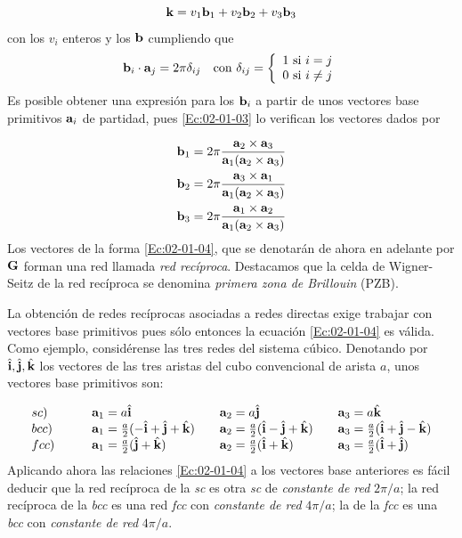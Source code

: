\begin{equation}
    \mathbf{k} = v_1 \mathbf{b}_1 + v_2 \mathbf{b}_2 + v_3 \mathbf{b}_3 \label{Ec:02-01-02}
\end{equation}
con los $v_i$ enteros y los $\mathbf{b}$ cumpliendo que
\begin{equation}
    \mathbf{b}_i \cdot \mathbf{a}_j = 2 \pi \delta_{ij}  \quad \text{con} \ \delta_{ij} = \left\lbrace \begin{array}{l}
        1 \ \text{si} \ i = j \\
        0 \ \text{si} \ i \neq j
    \end{array} \right. \label{Ec:02-01-03}
\end{equation}
Es posible obtener una expresión para los $\mathbf{b}_i$ a partir de unos vectores base primitivos $\mathbf{a}_i$ de partidad, pues \ref{Ec:02-01-03} lo verifican los vectores dados por

\begin{equation}
    \begin{split}    
    \mathbf{b}_1 & = 2 \pi \frac{\mathbf{a}_2 \times \mathbf{a}_3}{\mathbf{a}_1 (\mathbf{a}_2 \times \mathbf{a}_3)} \\
    \mathbf{b}_2 & = 2 \pi \frac{\mathbf{a}_3 \times \mathbf{a}_1}{\mathbf{a}_1 (\mathbf{a}_2 \times \mathbf{a}_3)}  \\
    \mathbf{b}_3 & = 2 \pi \frac{\mathbf{a}_1 \times \mathbf{a}_2}{\mathbf{a}_1 (\mathbf{a}_2 \times \mathbf{a}_3)}
    \end{split}\label{Ec:02-01-04}
\end{equation}
Los vectores de la forma \ref{Ec:02-01-04}, que se denotarán de ahora en adelante por $\mathbf{G}$ forman una red llamada \textit{red recíproca}. Destacamos que la celda de Wigner-Seitz de la red recíproca se denomina \textit{primera zona de Brillouin} (PZB). 

La obtención de redes recíprocas asociadas a redes directas exige trabajar con vectores base primitivos pues sólo entonces la ecuación \ref{Ec:02-01-04} es válida. Como ejemplo, considérense las tres redes del sistema cúbico. Denotando por $\hat{\mathbf{i}}, \hat{\mathbf{j}}, \hat{\mathbf{k}}$ los vectores de las tres aristas del cubo convencional de arista $a$, unos vectores base primitivos son:

\begin{equation*}
    \begin{array}{llll}
    sc) \quad &  \quad \mathbf{a}_1 = a \hat{\mathbf{i}} & \quad \mathbf{a}_2 = a \hat{\mathbf{j}} & \quad \mathbf{a}_3 = a \hat{\mathbf{k}} \\
    bcc)  \quad & \quad \mathbf{a}_1 = \frac{a}{2} (-\hat{\mathbf{i}}+\hat{\mathbf{j}}+\hat{\mathbf{k}}) & \quad \mathbf{a}_2 = \frac{a}{2} (\hat{\mathbf{i}}-\hat{\mathbf{j}}+\hat{\mathbf{k}})  & \quad \mathbf{a}_3 = \frac{a}{2} (\hat{\mathbf{i}}+\hat{\mathbf{j}}-\hat{\mathbf{k}})  \\
    fcc) \quad & \quad \mathbf{a}_1 = \frac{a}{2} (\hat{\mathbf{j}} + \hat{\mathbf{k}}) & \quad \mathbf{a}_2 = \frac{a}{2} (\hat{\mathbf{i}} + \hat{\mathbf{k}}) & \quad \mathbf{a}_3 = \frac{a}{2} (\hat{\mathbf{i}} + \hat{\mathbf{j}}) \\
    \end{array}
\end{equation*}
Aplicando ahora las relaciones \ref{Ec:02-01-04} a los vectores base anteriores es fácil deducir que la red recíproca de la \textit{sc} es otra \textit{sc} de \textit{constante de red} $2\pi/a$; la red recíproca de la \textit{bcc} es una red \textit{fcc} con \textit{constante de red} $4\pi/a$; la de la \textit{fcc} es una \textit{bcc} con \textit{constante de red} $4 \pi/a$. 

